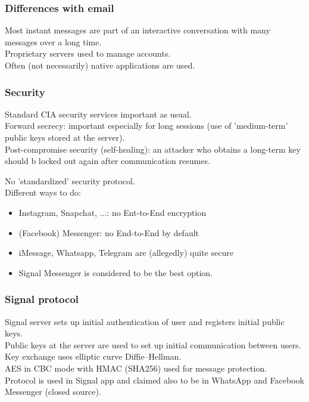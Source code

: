 \documentclass{article}
\begin{document}
\subsubsection{Differences with email}

Most instant messages are part of an interactive conversation with many messages over a long time.\\
Proprietary servers used to manage accounts.\\
Often (not necessarily) native applications are used.

\subsubsection{Security}

Standard CIA security services important as usual.\\
Forward secrecy: important especially for long sessions (use of 'medium-term' public keys stored at the server).\\
Post-compromise security (self-healing): an attacker who obtains a long-term key should b locked out again after communication resumes.

No 'standardized' security protocol.\\
Different ways to do:
\begin{itemize}
    \item Instagram, Snapchat, ...: no Ent-to-End encryption
    \item (Facebook) Messenger: no End-to-End by default
    \item iMessage, Whatsapp, Telegram are (allegedly) quite secure
    \item Signal Messenger is considered to be the best option.
\end{itemize}

\subsubsection{Signal protocol}

Signal server sets up initial authentication of user and registers initial public keys.\\
Public keys at the server are used to set up initial communication between users.\\
Key exchange uses elliptic curve Diffie–Hellman.\\
AES in CBC mode with HMAC (SHA256) used for message protection.\\
Protocol is used in Signal app and claimed also to be in WhatsApp and Facebook Messenger (closed source).
\end{document}
